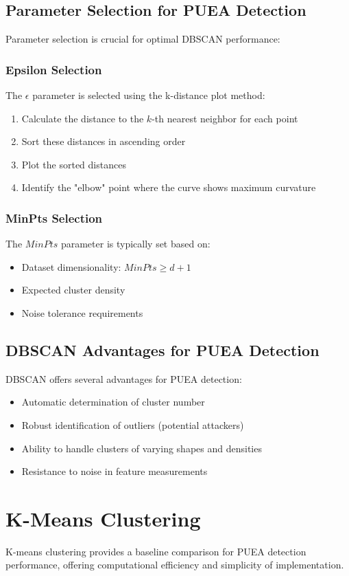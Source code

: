 \subsection{Parameter Selection for PUEA Detection}
Parameter selection is crucial for optimal DBSCAN performance:

\subsubsection{Epsilon Selection}
The $\epsilon$ parameter is selected using the k-distance plot method:
\begin{enumerate}
\item Calculate the distance to the $k$-th nearest neighbor for each point
\item Sort these distances in ascending order
\item Plot the sorted distances
\item Identify the "elbow" point where the curve shows maximum curvature
\end{enumerate}

\subsubsection{MinPts Selection}
The $MinPts$ parameter is typically set based on:
\begin{itemize}
\item Dataset dimensionality: $MinPts \geq d + 1$
\item Expected cluster density
\item Noise tolerance requirements
\end{itemize}

\subsection{DBSCAN Advantages for PUEA Detection}
DBSCAN offers several advantages for PUEA detection:
\begin{itemize}
\item Automatic determination of cluster number
\item Robust identification of outliers (potential attackers)
\item Ability to handle clusters of varying shapes and densities
\item Resistance to noise in feature measurements
\end{itemize}

\section{K-Means Clustering}
K-means clustering provides a baseline comparison for PUEA detection performance, offering computational efficiency and simplicity of implementation.

